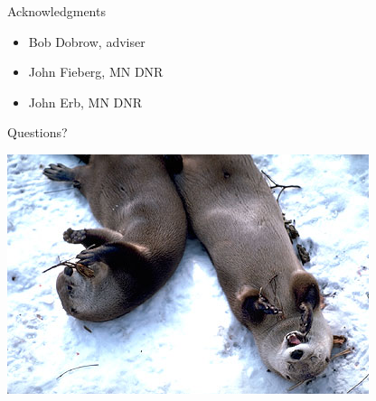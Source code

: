 \documentclass{beamer}
\begin{document}
\begin{frame}{Acknowledgments}
	\begin{itemize}
		\item Bob Dobrow, adviser
		\item John Fieberg, MN DNR
		\item John Erb, MN DNR
	\end{itemize}
	\begin{center}
	\end{center}
\end{frame}

\begin{frame}{Questions?}
	\begin{center}
	\includegraphics[scale=0.7]{Figures/Pictures/cuteOtter7.jpg}
	\end{center}
\end{frame}
\end{document}
